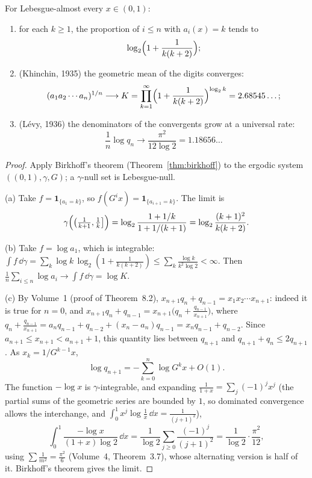 \begin{theorem}\label{thm:cfstats}
For Lebesgue-almost every $x\in(0,1)$:
\begin{enumerate}[label=(\alph*)]
\item for each $k\ge1$, the proportion of $i\le n$ with $a_i(x)=k$ tends to
\[
\log_2\Bigl(1+\frac1{k(k+2)}\Bigr);
\]
\item (Khinchin, 1935) the geometric mean of the digits converges:
\[
(a_1a_2\cdots a_n)^{1/n}\longrightarrow K=\prod_{k=1}^\infty\Bigl(1+\frac1{k(k+2)}\Bigr)^{\log_2k}=2.68545\ldots;
\]
\item (L\'evy, 1936) the denominators of the convergents grow at a universal rate:
\[
\frac1n\log q_n\longrightarrow\frac{\pi^2}{12\log2}=1.18656\ldots
\]
\end{enumerate}
\end{theorem}
\begin{proof}
Apply Birkhoff's theorem (Theorem~\ref{thm:birkhoff}) to the ergodic system $((0,1),\gamma,G)$; a $\gamma$-null set is Lebesgue-null.

(a) Take $f=\mathbf 1_{\{a_1=k\}}$, so $f(G^ix)=\mathbf 1_{\{a_{i+1}=k\}}$. The limit is
\[
\gamma\Bigl(\bigl(\tfrac1{k+1},\tfrac1k\bigr]\Bigr)=\log_2\frac{1+1/k}{1+1/(k+1)}=\log_2\frac{(k+1)^2}{k(k+2)}.
\]

(b) Take $f=\log a_1$, which is integrable: $\int f\,\dd\gamma=\sum_k\log k\,\log_2(1+\frac1{k(k+2)})\le\sum_k\frac{\log k}{k^2\log 2}<\infty$. Then $\frac1n\sum_{i\le n}\log a_i\to\int f\,\dd\gamma=\log K$.

(c) By Volume~1 (proof of Theorem~8.2), $x_{n+1}q_n+q_{n-1}=x_1x_2\cdots x_{n+1}$: indeed it is true for $n=0$, and $x_{n+1}q_n+q_{n-1}=x_{n+1}\bigl(q_n+\frac{q_{n-1}}{x_{n+1}}\bigr)$, where
$q_n+\frac{q_{n-1}}{x_{n+1}}=a_nq_{n-1}+q_{n-2}+(x_n-a_n)q_{n-1}=x_nq_{n-1}+q_{n-2}$. Since $a_{n+1}\le x_{n+1}<a_{n+1}+1$, this quantity lies between $q_{n+1}$ and $q_{n+1}+q_n\le2q_{n+1}$. As $x_k=1/G^{k-1}x$,
\[
\log q_{n+1}=-\sum_{k=0}^{n}\log G^kx+O(1).
\]
The function $-\log x$ is $\gamma$-integrable, and expanding $\frac1{1+x}=\sum_j(-1)^jx^j$ (the partial sums of the geometric series are bounded by $1$, so dominated convergence allows the interchange, and $\int_0^1x^j\log\frac1x\,\dd x=\frac1{(j+1)^2}$),
\[
\int_0^1\frac{-\log x}{(1+x)\log2}\,\dd x=\frac1{\log2}\sum_{j\ge0}\frac{(-1)^j}{(j+1)^2}=\frac1{\log2}\cdot\frac{\pi^2}{12},
\]
using $\sum\frac1{m^2}=\frac{\pi^2}6$ (Volume~4, Theorem~3.7), whose alternating version is half of it. Birkhoff's theorem gives the limit.
\end{proof}

